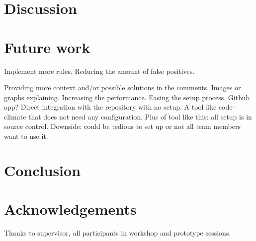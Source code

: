 \documentclass{article}
\begin{document}
\section{Discussion}
\label{discussion}

\section{Future work}
Implement more rules.
Reducing the amount of false positives.

Providing more context and/or possible solutions in the comments. Images or graphs explaining.
Increasing the performance.
Easing the setup process. Github app? Direct integration with the repository with no setup. A tool like code-climate that does not need any configuration. Plus of tool like this: all setup is in source control. Downside: could be tedious to set up or not all team members want to use it.

\section{Conclusion}
\label{conclusion}

\section{Acknowledgements}
\label{acknowledgements}
Thanks to supervisor, all participants in workshop and prototype sessions.

\printbibliography

\appendix
\label{appendix}

\end{document}
